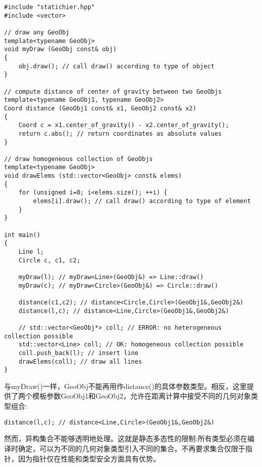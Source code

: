 \begin{lstlisting}[style=styleCXX]
#include "statichier.hpp"
#include <vector>

// draw any GeoObj
template<typename GeoObj>
void myDraw (GeoObj const& obj)
{
	obj.draw(); // call draw() according to type of object
}

// compute distance of center of gravity between two GeoObjs
template<typename GeoObj1, typename GeoObj2>
Coord distance (GeoObj1 const& x1, GeoObj2 const& x2)
{
	Coord c = x1.center_of_gravity() - x2.center_of_gravity();
	return c.abs(); // return coordinates as absolute values
}

// draw homogeneous collection of GeoObjs
template<typename GeoObj>
void drawElems (std::vector<GeoObj> const& elems)
{
	for (unsigned i=0; i<elems.size(); ++i) {
		elems[i].draw(); // call draw() according to type of element
	}
}

int main()
{
	Line l;
	Circle c, c1, c2;
	
	myDraw(l); // myDraw<Line>(GeoObj&) => Line::draw()
	myDraw(c); // myDraw<Circle>(GeoObj&) => Circle::draw()
	
	distance(c1,c2); // distance<Circle,Circle>(GeoObj1&,GeoObj2&)
	distance(l,c); // distance<Line,Circle>(GeoObj1&,GeoObj2&)
	
	// std::vector<GeoObj*> coll; // ERROR: no heterogeneous collection possible
	std::vector<Line> coll; // OK: homogeneous collection possible
	coll.push_back(l); // insert line
	drawElems(coll); // draw all lines
}
\end{lstlisting}

与myDraw()一样，GeoObj不能再用作distance()的具体参数类型。相反，这里提供了两个模板参数GeoObj1和GeoObj2，允许在距离计算中接受不同的几何对象类型组合:

\begin{lstlisting}[style=styleCXX]
distance(l,c); // distance<Line,Circle>(GeoObj1&,GeoObj2&)
\end{lstlisting}

然而，异构集合不能够透明地处理。这就是静态多态性的限制:所有类型必须在编译时确定，可以为不同的几何对象类型引入不同的集合。不再要求集合仅限于指针，因为指针仅在性能和类型安全方面具有优势。


















